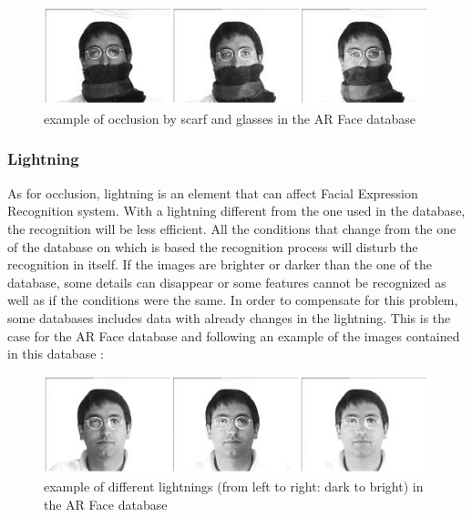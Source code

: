 \begin{figure}[!h]
\begin{center}
\noindent \includegraphics[scale=0.7]{figures/arface_example3} 
\newline
\caption{example of occlusion by scarf and glasses in the AR Face database}
\label{arface_example3}
\end{center} 
\end{figure} 

\subsubsection{Lightning}

\vspace{\baselineskip}
\noindent As for occlusion, lightning is an element that can affect Facial Expression Recognition system. With a lightning different from the one used in the database, the recognition will be less efficient. All the conditions that change from the one of the database on which is based the recognition process will disturb the recognition in itself. If the images are brighter or darker than the one of the database, some details can disappear or some features cannot be recognized as well as if the conditions were the same. In order to compensate for this problem, some databases includes data with already changes in the lightning. This is the case for the AR Face database and following an example of the images contained in this database \cite{ARFACE}:
\newline

\begin{figure}[!h]
\begin{center}
\noindent \includegraphics[scale=0.7]{figures/arface_example1} 
\newline
\caption{example of different lightnings (from left to right: dark to bright) in the AR Face database}
\label{arface_example1}
\end{center} 
\end{figure}

